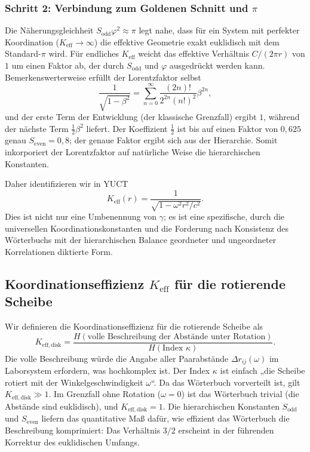 \documentclass[12pt,a4paper]{article}
\newcommand{\Sodd}{S_{\mathrm{odd}}}
\newcommand{\Seven}{S_{\mathrm{even}}}
\begin{document}
	\subsubsection{Schritt 2: Verbindung zum Goldenen Schnitt und \(\pi\)}
	Die Näherungsgleichheit \(\Sodd \varphi^2 \approx \pi\) legt nahe, dass für ein System mit perfekter Koordination (\(K_{\mathrm{eff}} \to \infty\)) die effektive Geometrie exakt euklidisch mit dem Standard-\(\pi\) wird. Für endliches \(K_{\mathrm{eff}}\) weicht das effektive Verhältnis \(C/(2\pi r)\) von \(1\) um einen Faktor ab, der durch \(\Sodd\) und \(\varphi\) ausgedrückt werden kann. Bemerkenswerterweise erfüllt der Lorentzfaktor selbst
	\[
	\frac{1}{\sqrt{1-\beta^2}} = \sum_{n=0}^{\infty} \frac{(2n)!}{2^{2n}(n!)^2} \beta^{2n},
	\]
	und der erste Term der Entwicklung (der klassische Grenzfall) ergibt \(1\), während der nächste Term \(\frac{1}{2}\beta^2\) liefert. Der Koeffizient \(\frac{1}{2}\) ist bis auf einen Faktor von \(0,625\) genau \(\Seven = 0,8\); der genaue Faktor ergibt sich aus der Hierarchie. Somit inkorporiert der Lorentzfaktor auf natürliche Weise die hierarchischen Konstanten.
	
	Daher identifizieren wir in YUCT
	\[
	\boxed{K_{\mathrm{eff}}(r) = \frac{1}{\sqrt{1 - \omega^2 r^2/c^2}}}.
	\]
	Dies ist nicht nur eine Umbenennung von \(\gamma\); es ist eine spezifische, durch die universellen Koordinationskonstanten und die Forderung nach Konsistenz des Wörterbuchs mit der hierarchischen Balance geordneter und ungeordneter Korrelationen diktierte Form.
	
	\subsection{Koordinationseffizienz \(K_{\mathrm{eff}}\) für die rotierende Scheibe}
	\label{subsec:keff-disk}
	
	Wir definieren die Koordinationseffizienz für die rotierende Scheibe als
	\[
	K_{\mathrm{eff,disk}} = \frac{H(\text{volle Beschreibung der Abstände unter Rotation})}{H(\text{Index } \kappa)}.
	\]
	Die volle Beschreibung würde die Angabe aller Paarabstände \(\Delta r_{ij}(\omega)\) im Laborsystem erfordern, was hochkomplex ist. Der Index \(\kappa\) ist einfach „die Scheibe rotiert mit der Winkelgeschwindigkeit \(\omega\)“. Da das Wörterbuch vorverteilt ist, gilt \(K_{\mathrm{eff,disk}} \gg 1\). Im Grenzfall ohne Rotation (\(\omega = 0\)) ist das Wörterbuch trivial (die Abstände sind euklidisch), und \(K_{\mathrm{eff,disk}} = 1\). Die hierarchischen Konstanten \(\Sodd\) und \(\Seven\) liefern das quantitative Maß dafür, wie effizient das Wörterbuch die Beschreibung komprimiert: Das Verhältnis \(3/2\) erscheint in der führenden Korrektur des euklidischen Umfangs.
	
\end{document}
